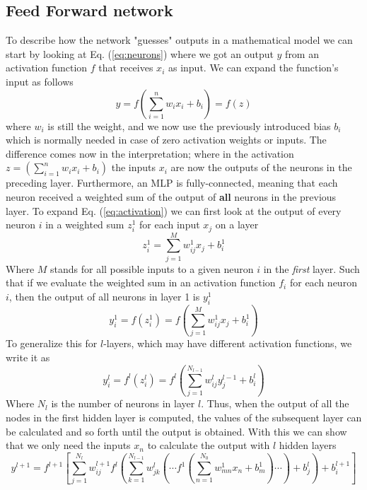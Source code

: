 \documentclass[12pt, a4paper]{book}
\begin{document}
\subsection{Feed Forward network}\label{sec:FFN}
To describe how the network "guesses" outputs in a mathematical model we can start by looking at Eq. (\ref{eq:neurons}) where we got an output $y$ from an activation function $f$ that receives $x_i$ as input. 
We can expand the function's input as follows
\begin{equation}\label{eq:activation}
    y=f\left(\sum_{i=1}^nw_ix_i+b_i\right)=f(z)
\end{equation} 
where $w_i$ is still the weight, and we now use the previously introduced bias $b_i$ which is normally needed in case of zero activation weights or inputs. The difference comes now in the interpretation; where in the activation 
$z=(\sum_{i=1}^nw_ix_i+b_i)$ the inputs $x_i$ are now the outputs of the neurons in the preceding layer. Furthermore, an MLP is fully-connected, meaning that each neuron received a weighted sum of the output of \textbf{all} 
neurons in the previous layer. To expand Eq. (\ref{eq:activation}) we can first look at the output of every neuron $i$ in a weighted sum $z^1_i$ for each input $x_j$ on a layer
\begin{equation}\label{eq:weightedsum}
    z_i^1=\sum_{j=1}^Mw_{ij}^1x_j + b^1_i
\end{equation}
Where $M$ stands for all possible inputs to a given neuron $i$ in the \textit{first} layer. Such that if we evaluate the weighted sum in an activation function $f_i$ for each neuron $i$, 
then the output of all neurons in layer 1 is $y_i^1$
$$
    y^1_i=f(z_i^1)=f\left(\sum_{j=1}^Mw_{ij}^1x_j + b^1_i\right)
$$
To generalize this for $l$-layers, which may have different activation functions, we write it as
$$
    y^l_i=f^l(z_i^l)=f^l\left(\sum_{j=1}^{N_{l-1}}w_{ij}^ly^{l-1}_j + b^l_i\right)
$$
Where $N_l$ is the number of neurons in layer $l$. Thus, when the output of all the nodes in the first hidden layer is computed, the values of the subsequent layer can be calculated and so forth until the output is obtained. 
With this we can show that we only need the inputs $x_n$ to calculate the output with $l$ hidden layers
\begin{equation}\label{eq:MLP}
    y^{l+1}=f^{l+1}\left[\sum_{j=1}^{N_l}w^{l+1}_{ij}f^l\left(\sum_{k=1}^{N_{l-1}}w^{l}_{jk}\left(\cdots f^{1}\left(\sum_{n=1}^{N_0}w^1_{mn}x_n+b_m^1\right)\cdots\right)+b_j^{l}\right)+b^{l+1}_i   \right]
\end{equation}
\end{document}
